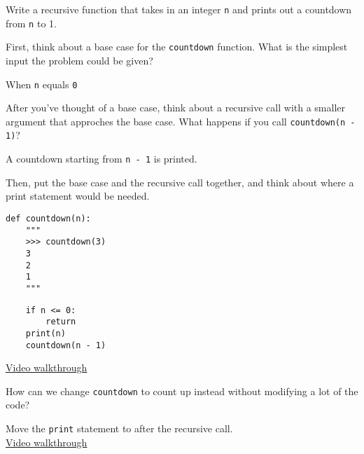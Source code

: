 \question Write a recursive function that takes in an integer {\tt n} and
prints out a countdown from {\tt n} to 1.

First, think about a base case for the {\tt countdown} function. What is
the simplest input the problem could be given?

\begin{solution}[0.35in]
When {\tt n} equals {\tt 0}
\end{solution}

After you've thought of a base case, think about a recursive call with a
smaller argument that approches the base case. What happens if you call
\texttt{countdown(n - 1)}?

\begin{solution}[0.35in]
A countdown starting from {\tt n - 1} is printed.
\end{solution}

\begin{blocksection}
Then, put the base case and the recursive call together, and think about
where a print statement would be needed.

\begin{lstlisting}
def countdown(n):
    """
    >>> countdown(3)
    3
    2
    1
    """
\end{lstlisting}
\begin{solution}[1.9in]
\begin{lstlisting}
    if n <= 0:
        return
    print(n)
    countdown(n - 1)
\end{lstlisting}
\href{https://youtu.be/VcZPTlE56G8?t=52m59s}{Video walkthrough}
\end{solution}
\end{blocksection}

\question How can we change {\tt countdown} to count up instead without
modifying a lot of the code?
\begin{solution}[0.7in]
Move the {\tt print} statement to after the recursive call. \\
\href{https://youtu.be/VcZPTlE56G8?t=58m48s}{Video walkthrough}
\end{solution}
